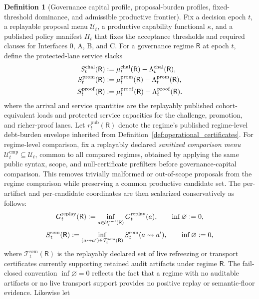 \documentclass[11pt]{article}
\theoremstyle{definition}
\newtheorem{definition}[theorem]{Definition}
\newcommand{\1}{\mathbf{1}}
\newcommand{\Defeq}{\vcentcolon=}
\begin{document}
\begin{definition}[Governance capital profile, proposal-burden profiles, fixed-threshold dominance, and admissible productive frontier]\label{def:frontier}
Fix a decision epoch $t$, a replayable proposal menu $\mathcal U_t$, a productive capability functional $\kappa$, and a published policy manifest $\Pi_t$ that fixes the acceptance thresholds and required clauses for Interfaces 0, A, B, and C. For a governance regime $\mathsf R$ at epoch $t$, define the protected-lane service slacks
\[
\begin{aligned}
S_t^{\mathrm{chal}}(\mathsf R)&\Defeq \mu_t^{\mathrm{chal}}(\mathsf R)-\Lambda_t^{\mathrm{chal}}(\mathsf R),\\
S_t^{\mathrm{prom}}(\mathsf R)&\Defeq \mu_t^{\mathrm{prom}}(\mathsf R)-\Lambda_t^{\mathrm{prom}}(\mathsf R),\\
S_t^{\mathrm{proof}}(\mathsf R)&\Defeq \mu_t^{\mathrm{proof}}(\mathsf R)-\Lambda_t^{\mathrm{proof}}(\mathsf R).
\end{aligned}
\]
where the arrival and service quantities are the replayably published cohort-equivalent loads and protected service capacities for the challenge, promotion, and richer-proof lanes. Let $r_t^{\mathrm{pub}}(\mathsf R)$ denote the regime's published regime-level debt-burden envelope inherited from Definition~\ref{def:operational_certificates}. For regime-level comparison, fix a replayably declared \emph{sanitized comparison menu} $\mathcal U_t^{\mathrm{cmp}}\subseteq \mathcal U_t$, common to all compared regimes, obtained by applying the same public syntax, scope, and null-certificate prefilters before governance-capital comparison. This removes trivially malformed or out-of-scope proposals from the regime comparison while preserving a common productive candidate set. The per-artifact and per-candidate coordinates are then scalarized conservatively as follows:
\[
G_t^{\mathrm{replay}}(\mathsf R)\Defeq \inf_{a\in\mathcal U_t^{\mathrm{aud}}(\mathsf R)} G_t^{\mathrm{replay}}(a),
\qquad
\inf\varnothing\Defeq 0,
\]
\[
\underline S_t^{\mathrm{sem}}(\mathsf R)\Defeq \inf_{(a\rightsquigarrow a')\in\mathcal T_t^{\mathrm{sem}}(\mathsf R)} \underline S_t^{\mathrm{sem}}(a\rightsquigarrow a'),
\qquad
\inf\varnothing\Defeq 0,
\]
where $\mathcal T_t^{\mathrm{sem}}(\mathsf R)$ is the replayably declared set of live refreezing or transport certificates currently supporting retained audit artifacts under regime $\mathsf R$. The fail-closed convention $\inf\varnothing=0$ reflects the fact that a regime with no auditable artifacts or no live transport support provides no positive replay or semantic-floor evidence. Likewise let

\end{definition}
\end{document}

